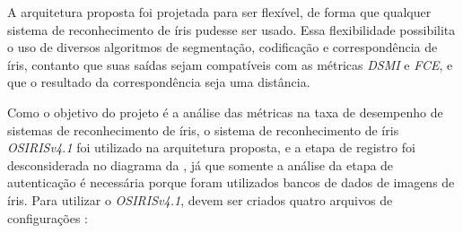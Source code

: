 
\par A arquitetura proposta foi projetada para ser flexível, de forma que qualquer sistema de reconhecimento de íris pudesse ser usado. Essa flexibilidade possibilita o uso de diversos algoritmos de segmentação, codificação e correspondência de íris, contanto que suas saídas sejam compatíveis com as métricas \textit{\acrshort{DSMI}} e \textit{\acrshort{FCE}}, e que o resultado da correspondência seja uma distância.

\par Como o objetivo do projeto é a análise das métricas na taxa de desempenho de sistemas de reconhecimento de íris, o sistema de reconhecimento de íris \textit{OSIRISv4.1} \cite{othman2015, osirisv41, osirisv41_doc} foi utilizado na arquitetura proposta, e a etapa de registro foi desconsiderada no diagrama da , já que somente a análise da etapa de autenticação é necessária porque foram utilizados bancos de dados de imagens de íris. Para utilizar o \textit{OSIRISv4.1}, devem ser criados quatro arquivos de configurações \cite{osirisv41_doc}:

